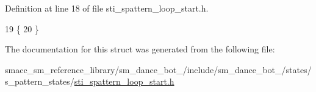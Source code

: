Definition at line 18 of file sti\+\_\+spattern\+\_\+loop\+\_\+start.\+h.


\begin{DoxyCode}
19   \{
20   \}
\end{DoxyCode}


The documentation for this struct was generated from the following file\+:\begin{DoxyCompactItemize}
\item 
smacc\+\_\+sm\+\_\+reference\+\_\+library/sm\+\_\+dance\+\_\+bot\+\_/include/sm\+\_\+dance\+\_\+bot\+\_/states/s\+\_\+pattern\+\_\+states/\hyperlink{3_2include_2sm__dance__bot__3_2states_2s__pattern__states_2sti__spattern__loop__start_8h}{sti\+\_\+spattern\+\_\+loop\+\_\+start.\+h}\end{DoxyCompactItemize}
